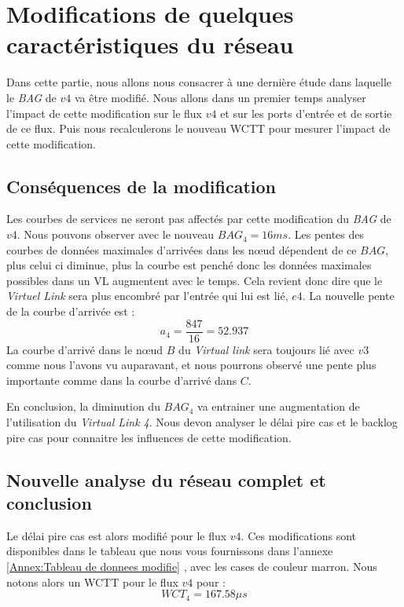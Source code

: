 \chapter{Modifications de quelques caractéristiques du réseau}
Dans cette partie, nous allons nous consacrer à une dernière étude dans laquelle le \emph{BAG} de $v4$ va être modifié. Nous allons dans un premier temps analyser l'impact de cette modification sur le flux $v4$ et sur les ports d'entrée et de sortie de ce flux. Puis nous recalculerons le nouveau WCTT pour mesurer l'impact de cette modification.

\section{Conséquences de la modification}
Les courbes de services ne seront pas affectés par cette modification du \emph{BAG} de $v4$. Nous pouvons observer avec le nouveau $BAG_4 = 16ms$. Les pentes des courbes de données maximales d'arrivées dans les nœud dépendent de ce $BAG$, plus celui ci diminue, plus la courbe est penché donc les données maximales possibles dans un VL augmentent avec le temps. Cela revient donc  dire que le \emph{Virtuel Link} sera plus encombré par l'entrée qui lui est lié, $e4$. La nouvelle pente de la courbe d'arrivée est :
\begin{equation}
a_4 = \frac{847}{16} = 52.937
\end{equation}
La courbe d'arrivé dans le nœud $B$ du \emph{Virtual link} sera toujours lié avec $v3$ comme nous l'avons vu auparavant, et nous pourrons observé une pente plus importante comme dans la courbe d'arrivé dans $C$. 

En conclusion, la diminution du $BAG_4$ va entrainer une augmentation de l'utilisation du \emph{Virtual Link 4}. Nous devon analyser le délai pire cas et le backlog pire cas pour connaitre les influences de cette modification.

\section{Nouvelle analyse du réseau complet et conclusion} 
Le délai pire cas est alors modifié pour le flux $v4$. Ces modifications sont disponibles dans le tableau que nous vous fournissons dans l'annexe \ref{Annex:Tableau de donnees modifie} , avec les cases de couleur marron. Nous notons alors un WCTT pour le flux $v4$ pour :\begin{equation}
WCT_4 = 167.58\mu s
\end{equation}

